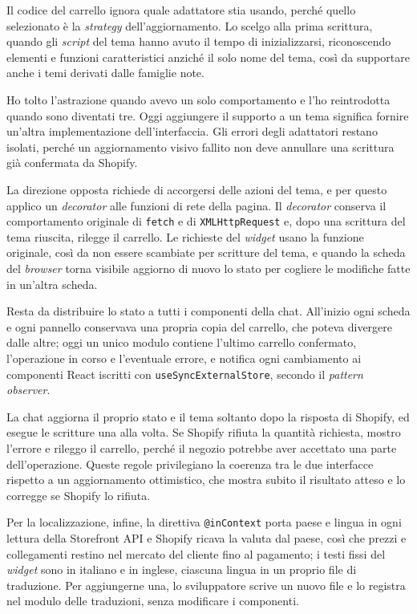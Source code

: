 Il codice del carrello ignora quale adattatore stia usando, perché quello selezionato è la
\emph{strategy} dell’aggiornamento. Lo scelgo alla prima scrittura, quando gli \emph{script} del
tema hanno avuto il tempo di inizializzarsi, riconoscendo elementi e funzioni caratteristici anziché
il solo nome del tema, così da supportare anche i temi derivati dalle famiglie note.

Ho tolto l’astrazione quando avevo un solo comportamento e l’ho reintrodotta quando sono diventati
tre. Oggi aggiungere il supporto a un tema significa fornire un’altra implementazione
dell’interfaccia. Gli errori
degli adattatori restano isolati, perché un aggiornamento visivo fallito non deve annullare una
scrittura già confermata da Shopify.

La direzione opposta richiede di accorgersi delle azioni del tema, e per questo applico un
\emph{decorator} alle funzioni di rete della pagina. Il \emph{decorator} conserva il comportamento
originale di \texttt{fetch} e di \texttt{XMLHttpRequest} e, dopo una scrittura del tema riuscita,
rilegge il carrello. Le richieste del \emph{widget} usano la funzione originale, così da non essere
scambiate
per scritture del tema, e quando la scheda del \emph{browser} torna visibile aggiorno di nuovo lo
stato per cogliere le modifiche fatte in un’altra scheda.

Resta da distribuire lo stato a tutti i componenti della chat. All’inizio ogni scheda e ogni
pannello conservava una propria copia del carrello, che poteva divergere dalle altre; oggi un unico
modulo contiene l’ultimo carrello confermato, l’operazione in corso e l’eventuale errore, e
notifica ogni cambiamento ai componenti React iscritti con \texttt{useSyncExternalStore}, secondo
il \emph{pattern observer}.

La chat aggiorna il proprio stato e il tema soltanto dopo la risposta di Shopify, ed esegue le
scritture una alla volta. Se Shopify rifiuta la quantità
richiesta, mostro l’errore e rileggo il carrello, perché il negozio potrebbe aver accettato una
parte dell’operazione. Queste regole privilegiano la coerenza tra le due interfacce rispetto a un
aggiornamento ottimistico, che mostra subito il risultato atteso e lo corregge se Shopify lo rifiuta.

Per la localizzazione, infine, la direttiva \texttt{@inContext} porta paese e lingua in ogni
lettura della Storefront API e Shopify ricava la valuta dal paese, così che prezzi e collegamenti
restino nel mercato del cliente fino al pagamento; i testi fissi del \emph{widget} sono in italiano
e in inglese, ciascuna lingua in un proprio file di traduzione. Per aggiungerne una, lo
sviluppatore scrive un nuovo file e lo registra nel modulo delle traduzioni, senza modificare i
componenti.

